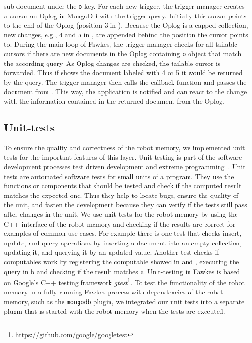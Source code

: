 sub-document under the \texttt{o} key. For each new trigger, the
trigger manager creates a cursor on Oplog in MongoDB with the trigger
query. Initially this cursor points to the end of the Oplog (position
3 in ). Because the Oplog is a capped
collection, new changes, e.g., 4 and 5 in ,
are appended behind the position the cursor points to. During the main
loop of Fawkes, the trigger manager checks for all tailable cursors if
there are new documents in the Oplog containing \texttt{o} object that match the according
query. As Oplog changes are checked, the tailable cursor is forwarded. Thus if
 shows the document labeled with 4 or 5 it would be
returned by the query.
The trigger manager then calls the callback function and passes the
document from . This way, the application is
notified and can react to the change with the information contained in
the returned document from the Oplog.

\subsection{Unit-tests}
\label{sec:impl-unittests}
To ensure the quality and correctness of the robot memory, we
implemented unit tests for the important features of this layer. Unit
testing is part of the software development processes test driven
development and extreme programming~\cite{beck-test,beck-xp}. Unit
tests are automated software tests for small units of a program. They
use the functions or components that should be tested and check if the
computed result matches the expected one. Thus they help to locate
bugs, ensure the quality of the unit, and fasten the development
because they can verify if the tests still pass after changes in the
unit. We use unit tests for the robot memory by using the C++
interface of the robot memory and checking if the results are correct
for examples of common use cases. For example there is one test that
checks insert, update, and query operations by inserting a document
into an empty collection, updating it, and querying it by an updated
value. Another test checks if computables work by registering the
computable showed in  and ,
executing the query in b and checking if the result
matches c. Unit-testing in Fawkes is based on Google's
C++ testing framework \emph{gtest}\footnote{\url{https://github.com/google/googletest}}. To test the functionality of the
robot memory in a fully running Fawkes process with dependencies of
the robot memory, such as the \texttt{mongodb} plugin, we integrated
our unit tests into a separate plugin that is started with the robot
memory when the tests are executed.

